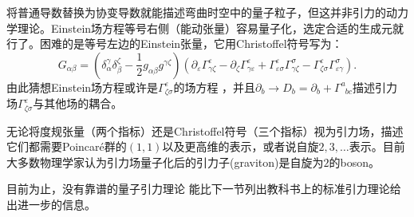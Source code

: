 将普通导数替换为协变导数就能描述弯曲时空中的量子粒子，但这并非引力的动力学理论。Einstein场方程等号右侧（能动张量）容易量子化，选定合适的生成元就行了。困难的是等号左边的Einstein张量，它用Christoffel符号写为：
\begin{equation}
\label{equ12.15}
    G_{\alpha \beta} = (\delta^\gamma_\alpha \delta^\zeta_\beta - \frac{1}{2} g_{\alpha \beta} g^{\gamma \zeta}) (\partial_\varepsilon \Gamma^\varepsilon_{\gamma \zeta} - \partial_\zeta \Gamma^\varepsilon_{\gamma \varepsilon} + \Gamma^\varepsilon_{\varepsilon \sigma} \Gamma^\sigma_{\gamma \zeta} - \Gamma^\varepsilon_{\zeta \sigma} \Gamma^\sigma_{\varepsilon \gamma}).
\end{equation}
由此猜想Einstein场方程或许是$\Gamma^\varepsilon_{\zeta \sigma}$的场方程%
%
，并且$\partial_b \to D_b = \partial_b + \Gamma^a_{\phantom{a} bc}$描述引力场$\Gamma^\varepsilon_{\zeta \sigma}$与其他场的耦合。

无论将度规张量（两个指标）还是Christoffel符号（三个指标）视为引力场，描述它们都需要Poincar\'e群的$(1, 1)$以及更高维的表示，或者说自旋$2, 3, \dots$表示。目前大多数物理学家认为引力场量子化后的引力子(graviton)是自旋为$2$的boson。

目前为止，没有靠谱的量子引力理论%
%
能比下一节列出教科书上的标准引力理论给出进一步的信息。

